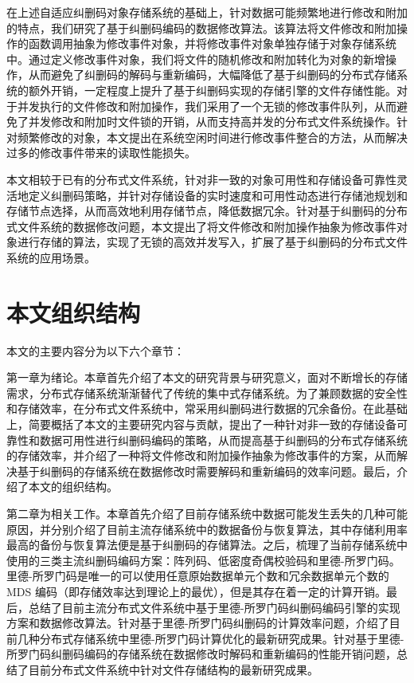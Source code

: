 在上述自适应纠删码对象存储系统的基础上，针对数据可能频繁地进行修改和附加的特点，我们研究了基于纠删码编码的数据修改算法。该算法将文件修改和附加操作的函数调用抽象为修改事件对象，并将修改事件对象单独存储于对象存储系统中。通过定义修改事件对象，我们将文件的随机修改和附加转化为对象的新增操作，从而避免了纠删码的解码与重新编码，大幅降低了基于纠删码的分布式存储系统的额外开销，一定程度上提升了基于纠删码实现的存储引擎的文件存储性能。对于并发执行的文件修改和附加操作，我们采用了一个无锁的修改事件队列，从而避免了并发修改和附加时文件锁的开销，从而支持高并发的分布式文件系统操作。针对频繁修改的对象，本文提出在系统空闲时间进行修改事件整合的方法，从而解决过多的修改事件带来的读取性能损失。

本文相较于已有的分布式文件系统，针对非一致的对象可用性和存储设备可靠性灵活地定义纠删码策略，并针对存储设备的实时速度和可用性动态进行存储池规划和存储节点选择，从而高效地利用存储节点，降低数据冗余。针对基于纠删码的分布式文件系统的数据修改问题，本文提出了将文件修改和附加操作抽象为修改事件对象进行存储的算法，实现了无锁的高效并发写入，扩展了基于纠删码的分布式文件系统的应用场景。

\section{本文组织结构}
本文的主要内容分为以下六个章节：

第一章为绪论。本章首先介绍了本文的研究背景与研究意义，面对不断增长的存储需求，分布式存储系统渐渐替代了传统的集中式存储系统。为了兼顾数据的安全性和存储效率，在分布式文件系统中，常采用纠删码进行数据的冗余备份。在此基础上，简要概括了本文的主要研究内容与贡献，提出了一种针对非一致的存储设备可靠性和数据可用性进行纠删码编码的策略，从而提高基于纠删码的分布式存储系统的存储效率，并介绍了一种将文件修改和附加操作抽象为修改事件的方案，从而解决基于纠删码的存储系统在数据修改时需要解码和重新编码的效率问题。最后，介绍了本文的组织结构。

第二章为相关工作。本章首先介绍了目前存储系统中数据可能发生丢失的几种可能原因，并分别介绍了目前主流存储系统中的数据备份与恢复算法，其中存储利用率最高的备份与恢复算法便是基于纠删码的存储算法。之后，梳理了当前存储系统中使用的三类主流纠删码编码方案：阵列码、低密度奇偶校验码和里德-所罗门码。里德-所罗门码是唯一的可以使用任意原始数据单元个数和冗余数据单元个数的 MDS 编码（即存储效率达到理论上的最优），但是其存在着一定的计算开销。最后，总结了目前主流分布式文件系统中基于里德-所罗门码纠删码编码引擎的实现方案和数据修改算法。针对基于里德-所罗门码纠删码的计算效率问题，介绍了目前几种分布式存储系统中里德-所罗门码计算优化的最新研究成果。针对基于里德-所罗门码纠删码编码的存储系统在数据修改时解码和重新编码的性能开销问题，总结了目前分布式文件系统中针对文件存储结构的最新研究成果。

